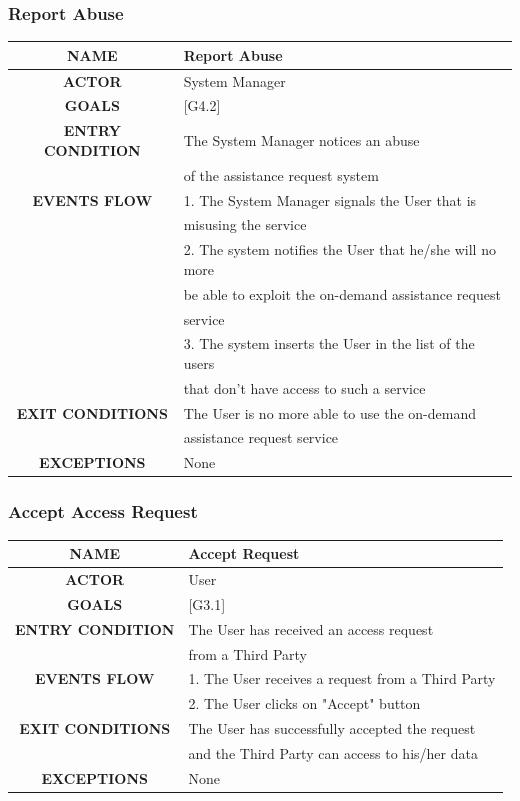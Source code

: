 \documentclass[12pt,a4paper]{article}
\begin{document}
		\subsubsection{Report Abuse}
		\begin{center}
			\begin{tabular}{| c | l |}
				\hline
				\textbf{NAME} & Report Abuse \\
				\hline
				\textbf{ACTOR} & System Manager \\
				\hline
				\textbf{GOALS} & [G4.2] \\
				\hline
				\textbf{ENTRY CONDITION} & The System Manager notices an abuse\\ 
				& of the assistance request system\\
				\hline
				\textbf{EVENTS FLOW}  &
				1. The System Manager signals the User that is \\
				& misusing the service\\
				&2. The system notifies the User that he/she will no more\\
				& be able to exploit the on-demand assistance request\\
				& service\\
				&3. The system inserts the User in the list of the users\\
				& that don't have access to such a service\\
				\hline
				\textbf{EXIT CONDITIONS}  & The User is no more able to use the on-demand\\
				& assistance request service\\ 
				\hline
				\textbf{EXCEPTIONS} & None \\
				\hline
			\end{tabular}
		\end{center}

		\subsubsection{Accept Access Request}
		\begin{center}
			\begin{tabular}{| c | l |}
				\hline
				\textbf{NAME} & Accept Request \\
				\hline
				\textbf{ACTOR} & User \\
				\hline
				\textbf{GOALS} & [G3.1] \\
				\hline
				\textbf{ENTRY CONDITION} & The User has received an access request\\
				& from a Third Party\\  \hline
				\textbf{EVENTS FLOW}  &
				1. The User receives a request from a Third Party\\
				&2. The User clicks on "Accept" button\\
				\hline
				\textbf{EXIT CONDITIONS}  & The User has successfully accepted the request\\ 
				& and the Third Party can access to his/her data\\
				\hline
				\textbf{EXCEPTIONS} &
				None\\
				\hline
			\end{tabular}
		\end{center}
\end{document}
